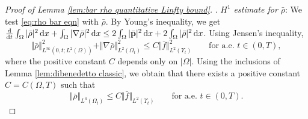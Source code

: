 \documentclass[11pt,a4paper,reqno]{amsart}
\theoremstyle{remark}
\theoremstyle{definition}
\numberwithin{equation}{section}
\newcommand{\p}{{\bf p}}
\renewcommand{\d}{\, \mathrm{d} }
\newcommand{\der}{\mathrm{d}}
\begin{document}
\begin{proof}[Proof of Lemma \ref{lem:bar rho quantitative Linfty bound}]
. \textit{$H^1$ estimate for $\bar{\rho}$}: We test \eqref{eq:rho bar eqn} with $\bar{\rho}$. By Young's inequality, we get $\frac{\der}{\der t}\int_\Omega |\bar{\rho}|^2 \d x + \int_\Omega |\nabla \bar{\rho}|^2 \d x \leq 2\int_\Omega |\bar{\p}|^2 \d x + 2 \int_\Omega |\bar{\rho}|^2 \d x$. Using Jensen's inequality, 
\begin{equation}\label{eq:H1 bar rho}
    \Vert \bar{\rho} \Vert_{L^\infty(0,t;L^2(\Omega))}^2 + \Vert \nabla \bar{\rho} \Vert_{L^2(\Omega_t)}^2 \leq C \Vert \bar{f} \Vert_{L^2(\Upsilon_t)}^2 \qquad \text{for a.e.~}t\in(0,T), 
\end{equation}
where the positive constant $C$ depends only on $|\Omega|$. Using the inclusions of Lemma \ref{lem:dibenedetto classic}, we obtain that there exists a positive constant $C=C(\Omega,T)$ such that 
\begin{equation}\label{eq:bar rho all Lq bounds}
    \Vert \bar{\rho} \Vert_{L^4(\Omega_t)} \leq C \Vert \bar{f} \Vert_{L^2(\Upsilon_t)} \qquad \text{for a.e.~} t \in (0,T). 
\end{equation} 


\smallskip 


\end{proof}
\end{document}
